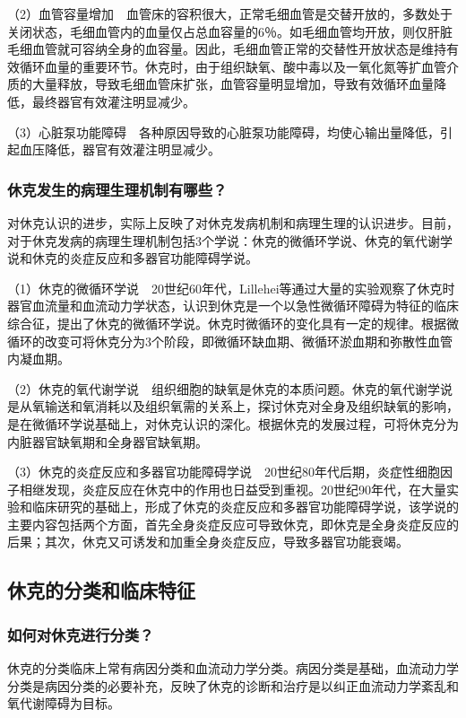 （2）血管容量增加　血管床的容积很大，正常毛细血管是交替开放的，多数处于关闭状态，毛细血管内的血量仅占总血容量的6％。如毛细血管均开放，则仅肝脏毛细血管就可容纳全身的血容量。因此，毛细血管正常的交替性开放状态是维持有效循环血量的重要环节。休克时，由于组织缺氧、酸中毒以及一氧化氮等扩血管介质的大量释放，导致毛细血管床扩张，血管容量明显增加，导致有效循环血量降低，最终器官有效灌注明显减少。

（3）心脏泵功能障碍　各种原因导致的心脏泵功能障碍，均使心输出量降低，引起血压降低，器官有效灌注明显减少。

\subsubsection{休克发生的病理生理机制有哪些？}

对休克认识的进步，实际上反映了对休克发病机制和病理生理的认识进步。目前，对于休克发病的病理生理机制包括3个学说：休克的微循环学说、休克的氧代谢学说和休克的炎症反应和多器官功能障碍学说。

（1）休克的微循环学说　20世纪60年代，Lillehei等通过大量的实验观察了休克时器官血流量和血流动力学状态，认识到休克是一个以急性微循环障碍为特征的临床综合征，提出了休克的微循环学说。休克时微循环的变化具有一定的规律。根据微循环的改变可将休克分为3个阶段，即微循环缺血期、微循环淤血期和弥散性血管内凝血期。

（2）休克的氧代谢学说　组织细胞的缺氧是休克的本质问题。休克的氧代谢学说是从氧输送和氧消耗以及组织氧需的关系上，探讨休克对全身及组织缺氧的影响，是在微循环学说基础上，对休克认识的深化。根据休克的发展过程，可将休克分为内脏器官缺氧期和全身器官缺氧期。

（3）休克的炎症反应和多器官功能障碍学说　20世纪80年代后期，炎症性细胞因子相继发现，炎症反应在休克中的作用也日益受到重视。20世纪90年代，在大量实验和临床研究的基础上，形成了休克的炎症反应和多器官功能障碍学说，该学说的主要内容包括两个方面，首先全身炎症反应可导致休克，即休克是全身炎症反应的后果；其次，休克又可诱发和加重全身炎症反应，导致多器官功能衰竭。

\subsection{休克的分类和临床特征}

\subsubsection{如何对休克进行分类？}

休克的分类临床上常有病因分类和血流动力学分类。病因分类是基础，血流动力学分类是病因分类的必要补充，反映了休克的诊断和治疗是以纠正血流动力学紊乱和氧代谢障碍为目标。

